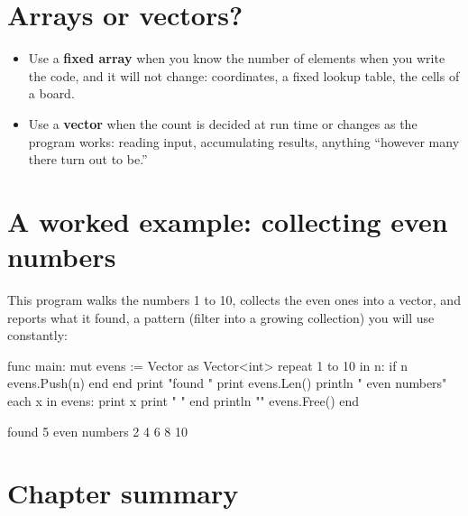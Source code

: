 \section{Arrays or vectors?}

\begin{itemize}[leftmargin=1.4em]
  \item Use a \textbf{fixed array} when you know the number of elements when you
        write the code, and it will not change: coordinates, a fixed lookup
        table, the cells of a board.
  \item Use a \textbf{vector} when the count is decided at run time or changes as
        the program works: reading input, accumulating results, anything
        ``however many there turn out to be.''
\end{itemize}

\section{A worked example: collecting even numbers}

This program walks the numbers 1 to 10, collects the even ones into a vector, and
reports what it found, a pattern (filter into a growing collection) you will use
constantly:

\begin{salamen}
func main:
    mut evens := Vector {} as Vector<int>
    repeat 1 to 10 in n:
        if n %
            evens.Push(n)
        end
    end
    print "found "
    print evens.Len()
    println " even numbers"
    each x in evens:
        print x
        print " "
    end
    println ""
    evens.Free()
end
\end{salamen}

\begin{progout}
found 5 even numbers
2 4 6 8 10
\end{progout}

\section{Chapter summary}

